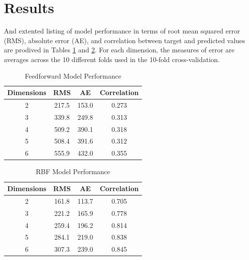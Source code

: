 \documentclass[conference]{IEEEtran}
\begin{document}
\section{Results}
  And extented listing of model performance in terms of root mean squared error (RMS), absolute error (AE), and correlation between target and predicted values are prodived in Tables \ref{table:ffError} and \ref{table:rbfError}. For each dimension, the measures of error are averages across the 10 different folds used in the 10-fold cross-validation.

  \begin{table}[h]
  \caption{Feedforward Model Performance}
  \resizebox{1.3\textwidth}{!} {\begin{minipage}{\textwidth}

      
      \begin{tabular}{ c | c | c | c }
        Dimensions & RMS & AE & Correlation \\ \hline
        2 & 217.5 & 153.0 & 0.273 \\
        3 & 339.8 & 249.8 & 0.313 \\
        4 & 509.2 & 390.1 & 0.318 \\
        5 & 508.4 & 391.6 & 0.312 \\
        6 & 555.9 & 432.0 & 0.355
      \end{tabular}

      \label{table:ffError}
  \end{minipage} }
  \end{table}

    \begin{table}[h]
  \caption{RBF Model Performance}
  \resizebox{1.3\textwidth}{!} {\begin{minipage}{\textwidth}

      
      \begin{tabular}{ c | c | c | c }
        Dimensions & RMS & AE & Correlation \\ \hline
        2 & 161.8 & 113.7 & 0.705 \\
        3 & 221.2 & 165.9 & 0.778 \\
        4 & 259.4 & 196.2 & 0.814 \\
        5 & 284.1 & 219.0 & 0.838 \\
        6 & 307.3 & 239.0 & 0.845
      \end{tabular}

      \label{table:rbfError}
  \end{minipage} }
    \end{table}
    
\end{document}
